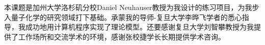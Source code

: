 
本课题是加州大学洛杉矶分校Daniel Neuhauser教授为我设计的练习项目，为我步入量子化学的研究领域打下基础。承蒙我的导师-复旦大学李晔飞学者的悉心指导，我成功地用计算机程序实现了理论模型。还要感谢复旦大学刘智攀教授为我提供了工作场所和交流学术的环境，感谢张校捷学长长期提供学术咨询。